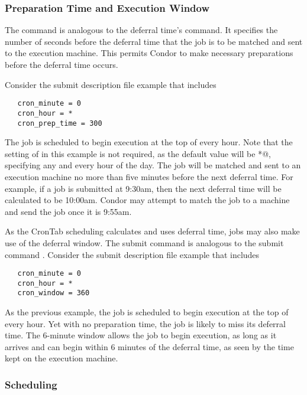 \subsubsection{Preparation Time and Execution Window}
\label{sec:CronTab-PrepTime}

The  command
is analogous to the deferral time's  command. 
It specifies the number of seconds before the deferral time
that the job is to be matched and sent to the execution machine. 
This permits Condor to
make necessary preparations before the deferral time occurs. 

Consider the submit description file example that includes 
\begin{verbatim}
   cron_minute = 0
   cron_hour = *
   cron_prep_time = 300
\end{verbatim}
The job is scheduled to begin execution at the top of every hour.
Note that the setting of  in this example
is not required, as the default value will be \verb@*@, 
specifying any and every hour of the day.
The job will be matched and sent to an execution machine 
no more than five minutes before the next deferral time. 
For example, if a job is submitted at 9:30am, then the 
next deferral time will be calculated to be 10:00am.
Condor may attempt to match the job to a machine and send the job
once it is 9:55am.

As the CronTab scheduling calculates and uses deferral time,
jobs may also make use of the deferral window.
The submit command  is analogous to
the submit command .
Consider the submit description file example that includes 
\begin{verbatim}
   cron_minute = 0
   cron_hour = *
   cron_window = 360
\end{verbatim}
As the previous example, the job is scheduled to begin execution
at the top of every hour.
Yet with no preparation time, the job is likely to miss
its deferral time.
The 6-minute window allows the job to begin execution,
as long as it arrives and can begin within 6 minutes of
the deferral time,
as seen by the time kept on the execution machine.

\subsubsection{Scheduling}
\label{sec:crontab-scheduling}

